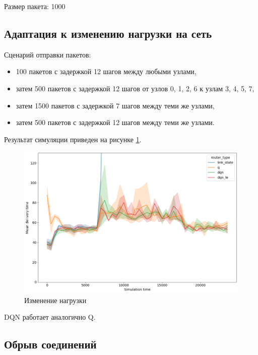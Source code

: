 \documentclass[a4paper]{article}
\begin{document}
Размер пакета: 1000

\subsection{Адаптация к изменению нагрузки на сеть}

Сценарий отправки пакетов:

\begin{itemize}
    \item 100 пакетов с задержкой 12 шагов между любыми узлами,

    \item затем 500 пакетов с задержкой 12 шагов от узлов 0, 1, 2, 6 к узлам 3,
        4, 5, 7,

    \item  затем 1500 пакетов с задержкой 7 шагов между теми же узлами,

    \item затем 500 пакетов с задержкой 12 шагов между теми же узлами.
\end{itemize}

Результат симуляции приведен на рисунке \ref{fig:load}.

\begin{figure}[H]
    \centering
    \includegraphics[width=\textwidth]{figs/load-increase}
    \caption{Изменение нагрузки}\label{fig:load}
\end{figure}

DQN работает аналогично Q.

\subsection{Обрыв соединений}
\end{document}
